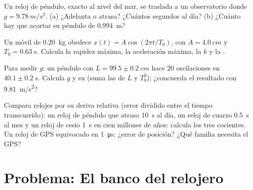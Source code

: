 \begin{exercise}[$\star\star\star$]\label{exo:g12:oscillators-and-time:12}
Un reloj de péndulo, exacto al nivel del mar, se traslada a un observatorio donde
$g = \qty{9.78}{m/s^2}$. (a) ¿Adelanta o atrasa? ¿Cuántos segundos al día? (b) ¿Cuánto
hay que acortar su péndulo de \qty{0.994}{m}?
\end{exercise}

\begin{exercise}[$\star\star\star$]\label{exo:g12:oscillators-and-time:13}
Un móvil de \qty{0.20}{kg} obedece $x(t) = A\cos(2\pi t/T_0)$, con
$A = \qty{4.0}{cm}$ y $T_0 = \qty{0.63}{s}$. Calcula la rapidez máxima, la aceleración
máxima, la  $k$ y la .
\end{exercise}

\begin{exercise}[$\star\star\star$]\label{exo:g12:oscillators-and-time:14}
Para medir $g$: un péndulo con $L = 99.5 \pm \qty{0.2}{cm}$ hace $20$ oscilaciones en
$40.1 \pm \qty{0.2}{s}$. Calcula $g$ y su  (suma las de $L$ y
$T_0^2$); ¿concuerda el resultado con \qty{9.81}{m/s^2}?
\end{exercise}

\begin{exercise}[$\star\star\star$]\label{exo:g12:oscillators-and-time:15}
Compara relojes por su deriva relativa (error dividido entre el tiempo transcurrido):
un reloj de péndulo que atrasa \qty{10}{s} al día, un reloj de cuarzo \qty{0.5}{s} al
mes y un reloj de cesio \qty{1}{s} en cien millones de años: calcula los tres
cocientes. Un reloj de GPS equivocado en \qty{1}{\micro s}: ¿error de posición? ¿Qué
familia necesita el GPS?
\end{exercise}

\section{Problema: El banco del relojero}

